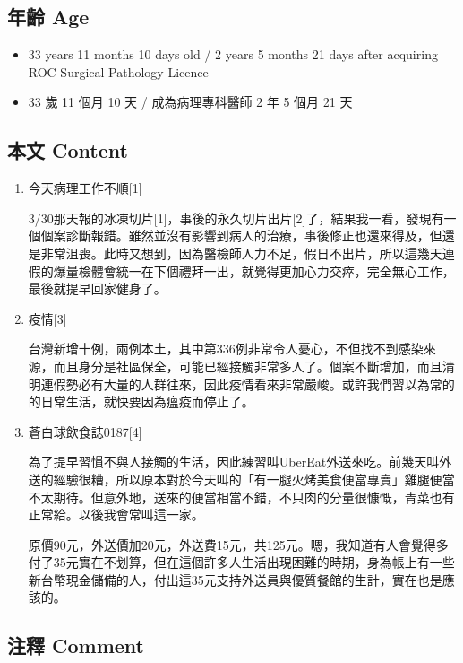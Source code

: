 \documentclass[a5paper, 12pt
]{book}
\providecommand{\tightlist}{%
  \setlength{\itemsep}{0pt}\setlength{\parskip}{0pt}}
\begin{document}
\hypertarget{ux5e74ux9f61-age-32}{%
\subsection{年齡 Age}\label{ux5e74ux9f61-age-32}}

\begin{itemize}
\tightlist
\item
  33 years 11 months 10 days old / 2 years 5 months 21 days after
  acquiring ROC Surgical Pathology Licence
\item
  33 歲 11 個月 10 天 / 成為病理專科醫師 2 年 5 個月 21 天
\end{itemize}

\hypertarget{ux672cux6587-content-32}{%
\subsection{本文 Content}\label{ux672cux6587-content-32}}

\begin{enumerate}
\def\labelenumi{\arabic{enumi}.}
\item
  今天病理工作不順{[}1{]}

  3/30那天報的冰凍切片{[}1{]}，事後的永久切片出片{[}2{]}了，結果我一看，發現有一個個案診斷報錯。雖然並沒有影響到病人的治療，事後修正也還來得及，但還是非常沮喪。此時又想到，因為醫檢師人力不足，假日不出片，所以這幾天連假的爆量檢體會統一在下個禮拜一出，就覺得更加心力交瘁，完全無心工作，最後就提早回家健身了。
\item
  疫情{[}3{]}

  台灣新增十例，兩例本土，其中第336例非常令人憂心，不但找不到感染來源，而且身分是社區保全，可能已經接觸非常多人了。個案不斷增加，而且清明連假勢必有大量的人群往來，因此疫情看來非常嚴峻。或許我們習以為常的的日常生活，就快要因為瘟疫而停止了。
\item
  蒼白球飲食誌0187{[}4{]}

  為了提早習慣不與人接觸的生活，因此練習叫UberEat外送來吃。前幾天叫外送的經驗很糟，所以原本對於今天叫的「有一腿火烤美食便當專賣」雞腿便當不太期待。但意外地，送來的便當相當不錯，不只肉的分量很慷慨，青菜也有正常給。以後我會常叫這一家。

  原價90元，外送價加20元，外送費15元，共125元。嗯，我知道有人會覺得多付了35元實在不划算，但在這個許多人生活出現困難的時期，身為帳上有一些新台幣現金儲備的人，付出這35元支持外送員與優質餐館的生計，實在也是應該的。
\end{enumerate}

\hypertarget{ux6ce8ux91cb-comment-32}{%
\subsection{注釋 Comment}\label{ux6ce8ux91cb-comment-32}}
\end{document}

